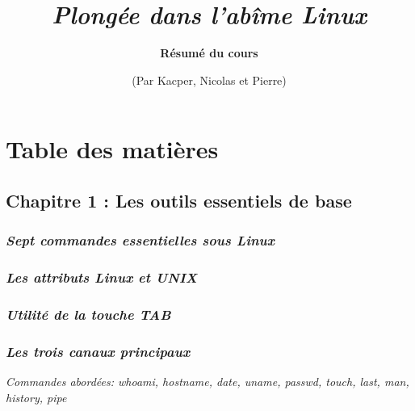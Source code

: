 \documentclass[12pt, a4paper]{article}
\begin{document}
\pagecolor{bgcolor}\afterpage{\nopagecolor}
\title{\vspace*{4.4cm}\textbf{\textit{\fontsize{40}{44}\selectfont Plongée dans l'abîme Linux\vspace{5.2em}}}}
\date{\fontsize{22}{24}\selectfont (Par Kacper, Nicolas et Pierre)}
\author{\textbf{\fontsize{36}{40}\selectfont Résumé du cours}}
\maketitle
\newpage
\vspace*{1cm}
\section{\textbf{\fontsize{30}{34}\selectfont Table des matières}}
\subsection{\Large Chapitre 1 : Les outils essentiels de base}
\subsubsection{\textit{Sept commandes essentielles sous Linux}}
\subsubsection{\textit{Les attributs Linux et UNIX}}
\subsubsection{\textit{Utilité de la touche TAB}}
\subsubsection{\textit{Les trois canaux principaux}}
\textit{Commandes abordées: \color{red}whoami, hostname, date, uname, passwd, touch, last, man, history, pipe\vspace{-0.65em}}
\end{document}

